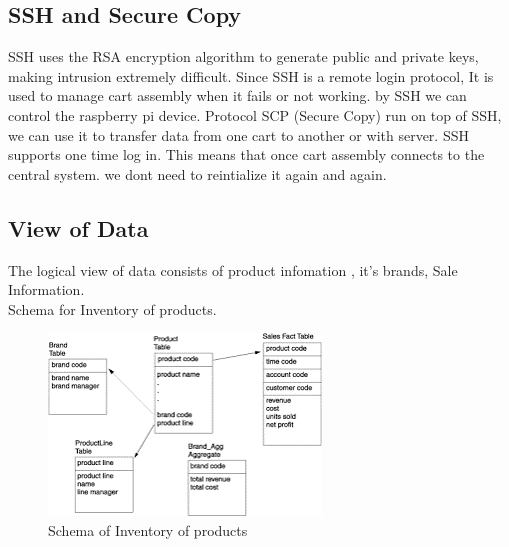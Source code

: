 \documentclass[a4paper,oneside,11pt,english]{report}
\begin{document}
	\subsection{SSH and Secure Copy}
		\par SSH uses the RSA encryption algorithm to generate public and private keys, making intrusion extremely difficult.
		Since SSH is a remote login protocol, It is used to manage cart assembly when it fails or not working. by SSH we can control the raspberry pi device.
		Protocol SCP (Secure Copy) run on top of SSH, we can use it  to transfer data from one cart to another or with server.
		SSH supports one time log in. This means that once cart assembly connects to the central system. we dont need to reintialize it again and again.
	\subsection{View of Data}
		\par The logical view of data consists of product infomation , it's brands, Sale Information. \\Schema for Inventory of products.\\
		\begin{figure}[ht]
			\includegraphics[width=\linewidth]{images/Schema.png}
			\caption {Schema of Inventory of products}
		\end{figure}
		
\end{document}
